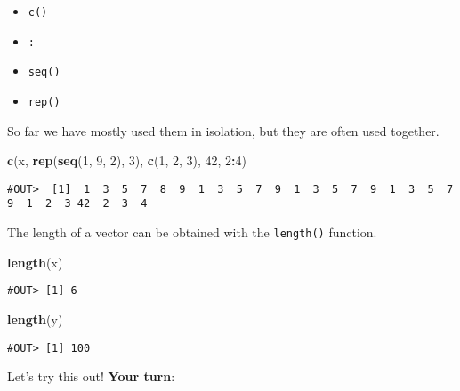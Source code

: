 \documentclass[]{book}
\newenvironment{Shaded}{\begin{snugshade}}{\end{snugshade}}
\newcommand{\DecValTok}[1]{\textcolor[rgb]{0.00,0.00,0.81}{#1}}
\newcommand{\KeywordTok}[1]{\textcolor[rgb]{0.13,0.29,0.53}{\textbf{#1}}}
\newcommand{\NormalTok}[1]{#1}
\newcommand{\OperatorTok}[1]{\textcolor[rgb]{0.81,0.36,0.00}{\textbf{#1}}}
\providecommand{\tightlist}{%
  \setlength{\itemsep}{0pt}\setlength{\parskip}{0pt}}
\newenvironment{warning}{\begin{tcolorbox}[colback=orange!5!white,colframe=orange]}{\end{tcolorbox}}
\begin{document}
\begin{itemize}
\tightlist
\item
  \texttt{c()}
\item
  \texttt{:}
\item
  \texttt{seq()}
\item
  \texttt{rep()}
\end{itemize}

So far we have mostly used them in isolation, but they are often used together.

\begin{Shaded}
\begin{Highlighting}[]
\KeywordTok{c}\NormalTok{(x, }\KeywordTok{rep}\NormalTok{(}\KeywordTok{seq}\NormalTok{(}\DecValTok{1}\NormalTok{, }\DecValTok{9}\NormalTok{, }\DecValTok{2}\NormalTok{), }\DecValTok{3}\NormalTok{), }\KeywordTok{c}\NormalTok{(}\DecValTok{1}\NormalTok{, }\DecValTok{2}\NormalTok{, }\DecValTok{3}\NormalTok{), }\DecValTok{42}\NormalTok{, }\DecValTok{2}\OperatorTok{:}\DecValTok{4}\NormalTok{)}
\end{Highlighting}
\end{Shaded}

\begin{verbatim}
#OUT>  [1]  1  3  5  7  8  9  1  3  5  7  9  1  3  5  7  9  1  3  5  7  9  1  2  3 42  2  3  4
\end{verbatim}

The length of a vector can be obtained with the \texttt{length()} function.

\begin{Shaded}
\begin{Highlighting}[]
\KeywordTok{length}\NormalTok{(x)}
\end{Highlighting}
\end{Shaded}

\begin{verbatim}
#OUT> [1] 6
\end{verbatim}

\begin{Shaded}
\begin{Highlighting}[]
\KeywordTok{length}\NormalTok{(y)}
\end{Highlighting}
\end{Shaded}

\begin{verbatim}
#OUT> [1] 100
\end{verbatim}

\begin{warning}
Let's try this out! \textbf{Your turn}:
\end{warning}
\end{document}
